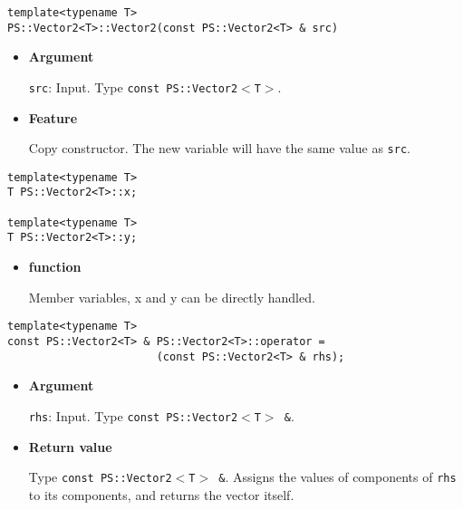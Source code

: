 
\begin{screen}
\begin{verbatim}
template<typename T>
PS::Vector2<T>::Vector2(const PS::Vector2<T> & src)
\end{verbatim}
\end{screen}

\begin{itemize}

\item{{\bf Argument}}

\texttt{src}: Input. Type \texttt{const PS::Vector2$<$T$>$}.

\item{{\bf Feature}}

Copy constructor. The new variable will have the same value as \texttt{src}.

\end{itemize}


\begin{screen}
\begin{verbatim}
template<typename T>
T PS::Vector2<T>::x;

template<typename T>
T PS::Vector2<T>::y;
\end{verbatim}
\end{screen}

\begin{itemize}
  
\item{{\bf function}}
  
  Member variables, {x} and {y} can be directly handled.
  
\end{itemize}





\begin{screen}
\begin{verbatim}
template<typename T>
const PS::Vector2<T> & PS::Vector2<T>::operator = 
                       (const PS::Vector2<T> & rhs);
\end{verbatim}
\end{screen}

\begin{itemize}

\item{{\bf Argument}}

\texttt{rhs}: Input. Type \texttt{const PS::Vector2$<$T$>$ \&}.

\item{{\bf Return value}}

Type \texttt{const PS::Vector2$<$T$>$ \&}. Assigns the values of components of \texttt{rhs}
to its components, and returns the vector itself.

\end{itemize}

